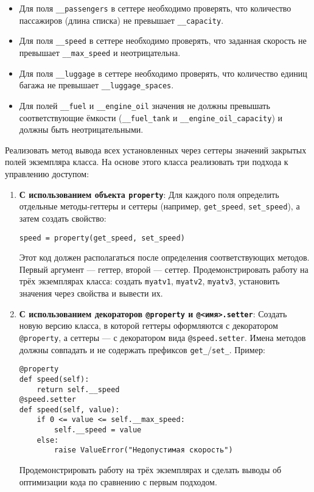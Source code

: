 \begin{enumerate}
\begin{itemize}
    \item Для поля \texttt{\_\_passengers} в сеттере необходимо проверять, что количество пассажиров (длина списка) не превышает \texttt{\_\_capacity}.  
    \item Для поля \texttt{\_\_speed} в сеттере необходимо проверять, что заданная скорость не превышает \texttt{\_\_max\_speed} и неотрицательна.  
    \item Для поля \texttt{\_\_luggage} в сеттере необходимо проверять, что количество единиц багажа не превышает \texttt{\_\_luggage\_spaces}.
    \item Для полей \texttt{\_\_fuel} и \texttt{\_\_engine\_oil} значения не должны превышать соответствующие ёмкости (\texttt{\_\_fuel\_tank} и \texttt{\_\_engine\_oil\_capacity}) и должны быть неотрицательными.
\end{itemize}
Реализовать метод вывода всех установленных через сеттеры значений закрытых полей экземпляра класса.
На основе этого класса реализовать три подхода к управлению доступом:
\begin{enumerate}
    \item \textbf{С использованием объекта \texttt{property}}:  
    Для каждого поля определить отдельные методы-геттеры и сеттеры (например, \texttt{get\_speed}, \texttt{set\_speed}), а затем создать свойство:  
    \begin{verbatim}
speed = property(get_speed, set_speed)
    \end{verbatim}  
    Этот код должен располагаться после определения соответствующих методов. Первый аргумент — геттер, второй — сеттер.  
    Продемонстрировать работу на трёх экземплярах класса: создать \texttt{myatv1}, \texttt{myatv2}, \texttt{myatv3}, установить значения через свойства и вывести их.
    \item \textbf{С использованием декораторов \texttt{@property} и \texttt{@<имя>.setter}}:  
    Создать новую версию класса, в которой геттеры оформляются с декоратором \texttt{@property}, а сеттеры — с декоратором вида \texttt{@speed.setter}. Имена методов должны совпадать и не содержать префиксов \texttt{get\_}/\texttt{set\_}.  
    Пример:  
    \begin{verbatim}
@property
def speed(self):
    return self.__speed
@speed.setter
def speed(self, value):
    if 0 <= value <= self.__max_speed:
        self.__speed = value
    else:
        raise ValueError("Недопустимая скорость")
    \end{verbatim}  
    Продемонстрировать работу на трёх экземплярах и сделать выводы об оптимизации кода по сравнению с первым подходом.

\end{enumerate}
\end{enumerate}
